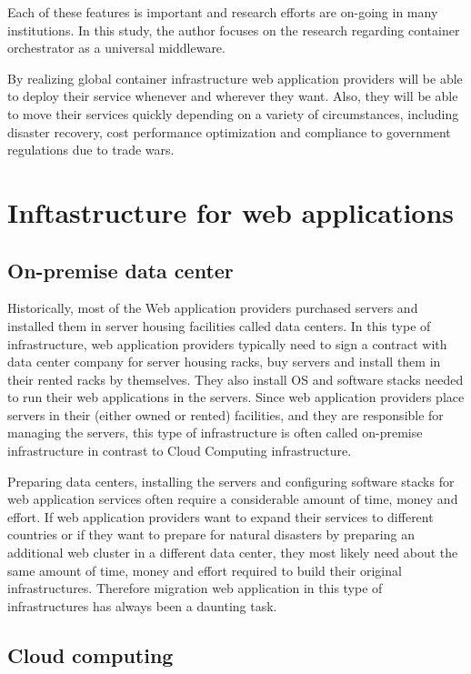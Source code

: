 Each of these features is important and research efforts are on-going in many institutions.
In this study, the author focuses on the research regarding container orchestrator as a universal middleware.

By realizing global container infrastructure web application providers will be able to deploy their service whenever and wherever they want.
Also, they will be able to move their services quickly depending on a variety of circumstances, including disaster recovery, cost performance optimization and compliance to government regulations due to trade wars.


\section{Inftastructure for web applications}

\subsection{On-premise data center}

Historically, most of the Web application providers purchased servers and installed them in server housing facilities called data centers.
In this type of infrastructure, web application providers typically need to sign a contract with data center company for server housing racks, buy servers and install them in their rented racks by themselves.
They also install OS and software stacks needed to run their web applications in the servers.
Since web application providers place servers in their (either owned or rented) facilities, and they are responsible for managing the servers, this type of infrastructure is often called on-premise infrastructure in contrast to Cloud Computing infrastructure.

Preparing data centers, installing the servers and configuring software stacks for web application services often require a considerable amount of time, money and effort.
If web application providers want to expand their services to different countries or if they want to prepare for natural disasters by preparing an additional web cluster in a different data center, they most likely need about the same amount of time, money and effort required to build their original infrastructures.
Therefore migration web application in this type of infrastructures has always been a daunting task.

\subsection{Cloud computing}

